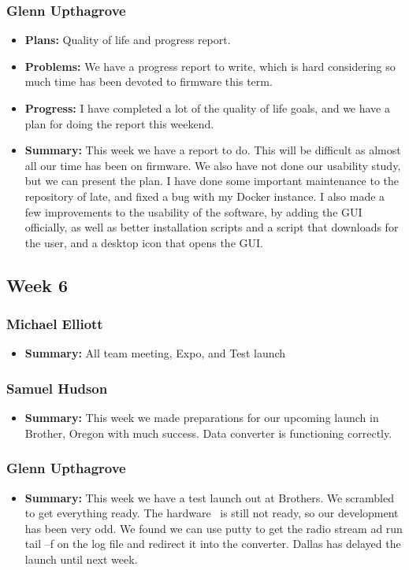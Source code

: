 \documentclass[onecolumn, draftclsnofoot,10pt, compsoc]{IEEEtran}
\begin{document}
\subsubsection{Glenn Upthagrove}
\begin {itemize}
 \item \textbf{Plans: }Quality of life and progress report. 
 \item \textbf{Problems: }We have a progress report to write, which is hard considering so much time has been devoted to firmware this term.    
 \item \textbf{Progress: }I have completed a lot of the quality of life goals, and we have a plan for doing the report this weekend. 
 \item \textbf{Summary: }This week we have a report to do. This will be difficult as almost all our time has been on firmware. We also have not done our usability study, but we can present the plan. I have done some important maintenance to the repository of late, and fixed a bug with my Docker instance. I also made a few improvements to the usability of the software, by adding the GUI officially, as well as better installation scripts and a script that downloads for the user, and a desktop icon that opens the GUI.     
\end {itemize}

\subsection{Week 6}
\subsubsection{Michael Elliott}
\begin{itemize}
 \item \textbf{Summary: } All team meeting, Expo, and Test launch
\end{itemize}
\subsubsection{Samuel Hudson}
\begin{itemize}
 \item \textbf{Summary: } This week we made preparations for our upcoming launch in Brother, Oregon with much success. Data converter is functioning correctly.
\end{itemize}
\subsubsection{Glenn Upthagrove}
\begin{itemize}
 \item \textbf{Summary: }This week we have a test launch out at Brothers. We scrambled to get everything ready. The hardware  is still not ready, so our development has been very odd. We found we can use putty to get the radio stream ad run tail –f on the log file and redirect it into the converter. Dallas has delayed the launch until next week. 
\end{itemize}
\end{document}
